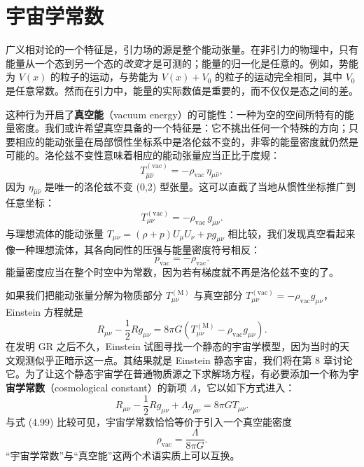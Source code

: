 \section{宇宙学常数}

广义相对论的一个特征是，引力场的源是整个能动张量。在非引力的物理中，只有能量从一个态到另一个态的\emph{改变}才是可测的；能量的归一化是任意的。例如，势能为 $V(x)$ 的粒子的运动，与势能为 $V(x)+V_0$ 的粒子的运动完全相同，其中 $V_0$ 是任意常数。然而在引力中，能量的实际数值是重要的，而不仅仅是态之间的差。

这种行为开启了\textbf{真空能}（vacuum energy）的可能性：一种为空的空间所特有的能量密度。我们或许希望真空具备的一个特征是：它不挑出任何一个特殊的方向；只要相应的能动张量在局部惯性坐标系中是洛伦兹不变的，非零的能量密度就仍然是可能的。洛伦兹不变性意味着相应的能动张量应当正比于度规：
\begin{equation*}
T^{(\mathrm{vac})}_{\hat\mu\hat\nu} = -\rho_{\mathrm{vac}}\,\eta_{\hat\mu\hat\nu},
\tag{4.96}
\end{equation*}
因为 $\eta_{\hat\mu\hat\nu}$ 是唯一的洛伦兹不变 (0,2) 型张量。这可以直截了当地从惯性坐标推广到任意坐标：
\begin{equation*}
T^{(\mathrm{vac})}_{\mu\nu} = -\rho_{\mathrm{vac}}\,g_{\mu\nu}.
\tag{4.97}
\end{equation*}
与理想流体的能动张量 $T_{\mu\nu}=(\rho+p)U_\mu U_\nu + pg_{\mu\nu}$ 相比较，我们发现真空看起来像一种理想流体，其各向同性的压强与能量密度符号相反：
\begin{equation*}
p_{\mathrm{vac}} = -\rho_{\mathrm{vac}}.
\tag{4.98}
\end{equation*}
能量密度应当在整个时空中为常数，因为若有梯度就不再是洛伦兹不变的了。

如果我们把能动张量分解为物质部分 $T^{(\mathrm{M})}_{\mu\nu}$ 与真空部分 $T^{(\mathrm{vac})}_{\mu\nu}=-\rho_{\mathrm{vac}}g_{\mu\nu}$，Einstein 方程就是
\begin{equation*}
R_{\mu\nu}-\frac{1}{2}Rg_{\mu\nu} = 8\pi G\left(T^{(\mathrm{M})}_{\mu\nu}-\rho_{\mathrm{vac}}g_{\mu\nu}\right).
\tag{4.99}
\end{equation*}
在发明 GR 之后不久，Einstein 试图寻找一个静态的宇宙学模型，因为当时的天文观测似乎正暗示这一点。其结果就是 Einstein 静态宇宙，我们将在第 8 章讨论它。为了让这个静态宇宙学在普通物质源之下求解场方程，有必要添加一个称为\textbf{宇宙学常数}（cosmological constant）的新项 $\Lambda$，它以如下方式进入：
\begin{equation*}
R_{\mu\nu}-\frac{1}{2}Rg_{\mu\nu} + \Lambda g_{\mu\nu} = 8\pi G T_{\mu\nu}.
\tag{4.100}
\end{equation*}
与式 (4.99) 比较可见，宇宙学常数恰恰等价于引入一个真空能密度
\begin{equation*}
\rho_{\mathrm{vac}} = \frac{\Lambda}{8\pi G}.
\tag{4.101}
\end{equation*}
“宇宙学常数”与“真空能”这两个术语实质上可以互换。


